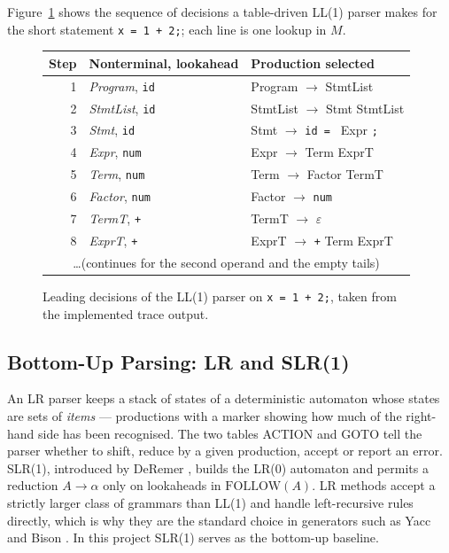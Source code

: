 \documentclass[12pt,a4paper]{article}
\newcommand{\ntm}[1]{\textit{#1}}
\newcommand{\tok}[1]{\texttt{#1}}
\begin{document}
Figure~\ref{fig:ll1trace} shows the sequence of decisions a table-driven
LL(1) parser makes for the short statement \tok{x = 1 + 2;}; each line is one
lookup in $M$.

\begin{figure}[H]
\centering
\small
\begin{tabular}{rll}
\toprule
\textbf{Step} & \textbf{Nonterminal, lookahead} & \textbf{Production selected}\\
\midrule
1 & \ntm{Program}, \tok{id}  & Program $\rightarrow$ StmtList\\
2 & \ntm{StmtList}, \tok{id} & StmtList $\rightarrow$ Stmt StmtList\\
3 & \ntm{Stmt}, \tok{id}     & Stmt $\rightarrow$ \tok{id = } Expr \tok{;}\\
4 & \ntm{Expr}, \tok{num}    & Expr $\rightarrow$ Term ExprT\\
5 & \ntm{Term}, \tok{num}    & Term $\rightarrow$ Factor TermT\\
6 & \ntm{Factor}, \tok{num}  & Factor $\rightarrow$ \tok{num}\\
7 & \ntm{TermT}, \tok{+}     & TermT $\rightarrow$ $\varepsilon$\\
8 & \ntm{ExprT}, \tok{+}     & ExprT $\rightarrow$ \tok{+} Term ExprT\\
\multicolumn{3}{c}{\dots (continues for the second operand and the empty tails)}\\
\bottomrule
\end{tabular}
\caption{Leading decisions of the LL(1) parser on \tok{x = 1 + 2;}, taken from the implemented trace output.}
\label{fig:ll1trace}
\end{figure}

\subsection{Bottom-Up Parsing: LR and SLR(1)}

An LR parser keeps a stack of states of a deterministic automaton whose states
are sets of \emph{items} --- productions with a marker showing how much of the
right-hand side has been recognised. The two tables ACTION and GOTO tell the
parser whether to shift, reduce by a given production, accept or report an
error. SLR(1), introduced by DeRemer \cite{deremer1971}, builds the LR(0)
automaton and permits a reduction $A\rightarrow\alpha$ only on lookaheads in
$\mathrm{FOLLOW}(A)$. LR methods accept a strictly larger class of grammars than
LL(1) and handle left-recursive rules directly, which is why they are the
standard choice in generators such as Yacc and Bison \cite{knuth1965}.
In this project SLR(1) serves as the bottom-up baseline.
\end{document}
